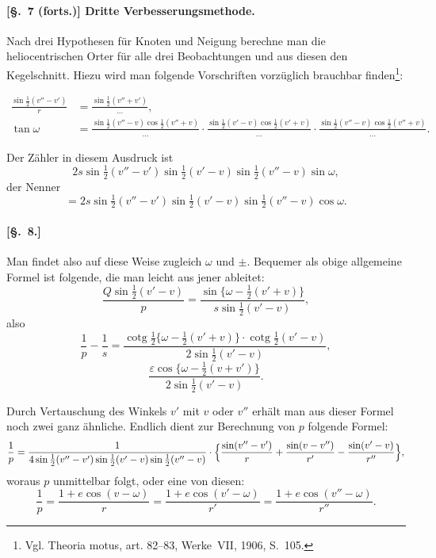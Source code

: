 \documentclass[12pt,a4paper]{article}
\DeclareMathOperator{\cotg}{cotg}
\theoremstyle{plain}
\theoremstyle{definition}
\theoremstyle{remark}
\begin{document}
\newpage

\paragraph{[§.~7 (forts.)] Dritte Verbesserungsmethode.}

Nach drei Hypothesen für Knoten und Neigung berechne man die heliocentrischen Orter für alle drei Beobachtungen und aus diesen den Kegelschnitt. Hiezu wird man folgende Vorschriften vorzüglich brauchbar finden\footnote{Vgl. Theoria motus, art. 82--83, Werke~VII, 1906, S.~105.}:

\begin{align*}
\frac{\sin\tfrac{1}{2}(v'' - v')}{r} &= \frac{\sin\tfrac{1}{2}(v'' + v')}{\dots}, \\
\tan\omega &= \frac{\sin\tfrac{1}{2}(v'' - v) \cos\tfrac{1}{2}(v'' + v)}{\dots} \cdot \frac{\sin\tfrac{1}{2}(v' - v) \cos\tfrac{1}{2}(v' + v)}{\dots} \cdot \frac{\sin\tfrac{1}{2}(v'' - v) \cos\tfrac{1}{2}(v'' + v)}{\dots}.
\end{align*}

Der Zähler in diesem Ausdruck ist
\[2s \sin\tfrac{1}{2}(v'' - v') \sin\tfrac{1}{2}(v' - v) \sin\tfrac{1}{2}(v'' - v) \sin\omega,\]
der Nenner
\[= 2s \sin\tfrac{1}{2}(v'' - v') \sin\tfrac{1}{2}(v' - v) \sin\tfrac{1}{2}(v'' - v) \cos\omega.\]

\newpage

\paragraph{[§.~8.]}

Man findet also auf diese Weise zugleich $\omega$ und $\pm$. Bequemer als obige allgemeine Formel ist folgende, die man leicht aus jener ableitet:
\[
\frac{Q \sin\tfrac{1}{2}(v' - v)}{p} = \frac{\sin\{\omega - \tfrac{1}{2}(v' + v)\}}{s \sin\tfrac{1}{2}(v' - v)},
\]
also
\[
\frac{1}{p} - \frac{1}{s} = \frac{\cotg\tfrac{1}{2}\{\omega - \tfrac{1}{2}(v' + v)\} \cdot \cotg\tfrac{1}{2}(v' - v)}{2 \sin\tfrac{1}{2}(v' - v)},
\]
\[
\frac{\varepsilon \cos\{\omega - \tfrac{1}{2}(v + v')\}}{2 \sin\tfrac{1}{2}(v' - v)}.
\]

Durch Vertauschung des Winkels $v'$ mit $v$ oder $v''$ erhält man aus dieser Formel noch zwei ganz ähnliche. Endlich dient zur Berechnung von $p$ folgende Formel:
\[
\frac{1}{p} = \frac{1}{4 \sin\tfrac{1}{2}(v'' - v') \sin\tfrac{1}{2}(v' - v) \sin\tfrac{1}{2}(v'' - v)} \cdot \Bigl\{\frac{\sin(v'' - v')}{r} + \frac{\sin(v - v'')}{r'} - \frac{\sin(v' - v)}{r''}\Bigr\},
\]
woraus $p$ unmittelbar folgt, oder eine von diesen:
\[
\frac{1}{p} = \frac{1 + e \cos(v - \omega)}{r} = \frac{1 + e \cos(v' - \omega)}{r'} = \frac{1 + e \cos(v'' - \omega)}{r''}.
\]
\end{document}
